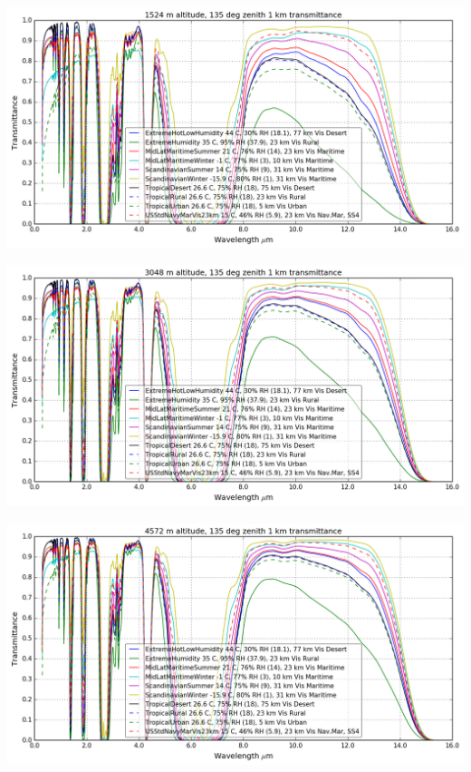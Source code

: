 \documentclass{workpackage}
\begin{document}
\begin{center}
\includegraphics{./pic/Analyse-Standard-Atmospheres_17_12.png}
\end{center}

\begin{center}
\includegraphics{./pic/Analyse-Standard-Atmospheres_17_13.png}
\end{center}

\begin{center}
\includegraphics{./pic/Analyse-Standard-Atmospheres_17_14.png}
\end{center}
\end{document}
